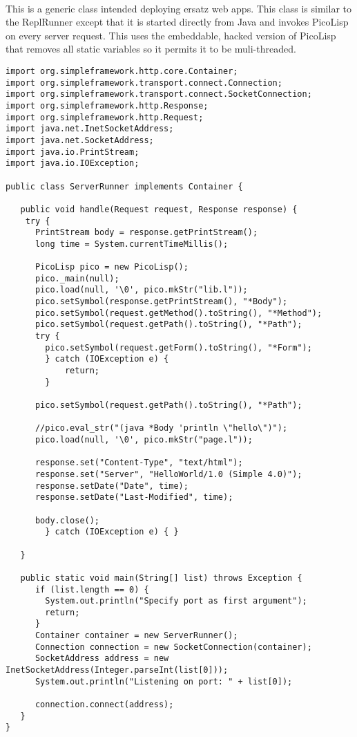 \documentclass[10pt,a4paper]{article}
\begin{document}
\\
This is a generic class intended deploying ersatz web apps. This class is similar to the ReplRunner except that it is started directly from Java and invokes PicoLisp on every server request. This uses the embeddable, hacked version of PicoLisp that removes all static variables so it permits it to be muli-threaded.
\begin{verbatim}
import org.simpleframework.http.core.Container;
import org.simpleframework.transport.connect.Connection;
import org.simpleframework.transport.connect.SocketConnection;
import org.simpleframework.http.Response;
import org.simpleframework.http.Request;
import java.net.InetSocketAddress;
import java.net.SocketAddress;
import java.io.PrintStream;
import java.io.IOException;

public class ServerRunner implements Container {

   public void handle(Request request, Response response) {
	try {
      PrintStream body = response.getPrintStream();
      long time = System.currentTimeMillis();

	  PicoLisp pico = new PicoLisp();
	  pico._main(null);
      pico.load(null, '\0', pico.mkStr("lib.l"));
	  pico.setSymbol(response.getPrintStream(), "*Body");
	  pico.setSymbol(request.getMethod().toString(), "*Method");
	  pico.setSymbol(request.getPath().toString(), "*Path");
	  try {
		pico.setSymbol(request.getForm().toString(), "*Form");
		} catch (IOException e) {
			return;
		}

	  pico.setSymbol(request.getPath().toString(), "*Path");

	  //pico.eval_str("(java *Body 'println \"hello\")");
      pico.load(null, '\0', pico.mkStr("page.l"));

      response.set("Content-Type", "text/html");
      response.set("Server", "HelloWorld/1.0 (Simple 4.0)");
      response.setDate("Date", time);
      response.setDate("Last-Modified", time);

      body.close();
      	} catch (IOException e) { }

   }

   public static void main(String[] list) throws Exception {
	  if (list.length == 0) {
		System.out.println("Specify port as first argument");
		return;
	  }
      Container container = new ServerRunner();
      Connection connection = new SocketConnection(container);
      SocketAddress address = new InetSocketAddress(Integer.parseInt(list[0]));
	  System.out.println("Listening on port: " + list[0]);

      connection.connect(address);
   }
}
\end{verbatim}
\end{document}
